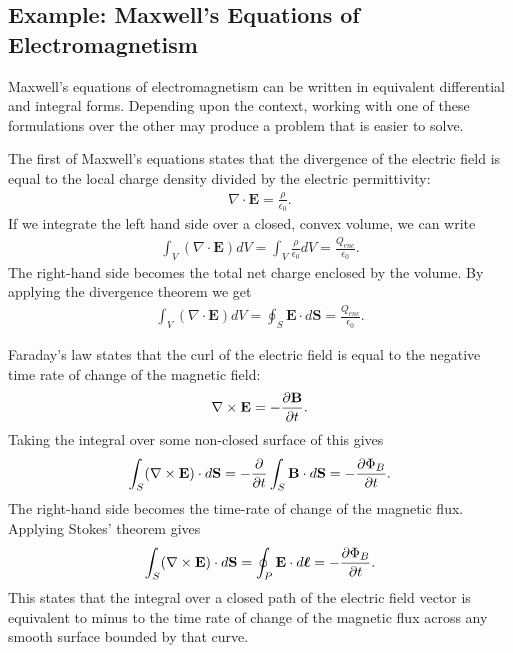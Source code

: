 \subsection{Example: Maxwell's Equations of Electromagnetism}

Maxwell's equations of electromagnetism can be written in equivalent differential and integral forms. Depending upon the context, working with one of these formulations over the other may produce a problem that is easier to solve.

The first of Maxwell's equations states that the divergence of the electric field is equal to the local charge density divided by the electric permittivity:
\begin{align}
  \nabla \cdot \mathbf{E} = \frac{\rho}{\epsilon_0}.
\end{align}
If we integrate the left hand side over a closed, convex volume, we can write
\begin{align}
  \int_V ( \nabla \cdot \mathbf{E} ) dV = \int_V \frac{\rho}{\epsilon_0} dV = \frac{Q_{enc}}{\epsilon_0} .%
\end{align}
The right-hand side becomes the total net charge enclosed by the volume. By applying the divergence theorem we get
\begin{align}
  \int_V ( \nabla \cdot \mathbf{E} ) dV = \oint_S \mathbf{E} \cdot d\mathbf{S} = \frac{Q_{enc}}{\epsilon_0} .
\end{align}

Faraday's law states that the curl of the electric field is equal to the negative time rate of change of the magnetic field:
\begin{align}
  \nabla \times \mathbf{E} = -\frac{ \partial {\mathbf{B}} }{ \partial {t} } .
\end{align}
Taking the integral over some non-closed surface of this gives
\begin{align}
  \int_S ( \nabla \times \mathbf{E} ) \cdot d\mathbf{S} = -\frac{ \partial {} }{ \partial {t} } \int_S \mathbf{B} \cdot d\mathbf{S} = -\frac{ \partial {\Phi_B} }{ \partial {t} } .
\end{align}
The right-hand side becomes the time-rate of change of the magnetic flux. Applying Stokes' theorem gives
\begin{align}
  \int_S ( \nabla \times \mathbf{E} ) \cdot d\mathbf{S} = \oint_{P} \mathbf{E} \cdot d\boldsymbol\ell = -\frac{ \partial {\Phi_B} }{ \partial {t} } .
\end{align}
This states that the integral over a closed path of the electric field vector is equivalent to minus to the time rate of change of the magnetic flux across any smooth surface bounded by that curve.

